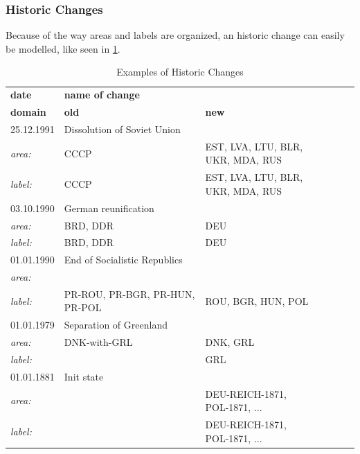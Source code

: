 

\subsubsection{Historic Changes} %
\label{ssub:historic_changes}
Because of the way areas and labels are organized, an historic change can easily be modelled, like seen in \ref{tab:changes}.

\begin{table}[ht]
\begin{small}
  \caption{Examples of Historic Changes}
  \label{tab:changes}
  \begin{center}
    \begin{tabular}{lllllll}
    \hline

    \hline
    \textbf{date} & \textbf{name of change} & \\
    \textbf{domain} & \textbf{old} & \textbf{new} \\
    \hline
    25.12.1991 & Dissolution of Soviet Union & \\
    \textit{area:} & CCCP & \pbox{5cm}{EST, LVA, LTU, BLR, \\ UKR, MDA, RUS} \\
    \textit{label:} & CCCP & \pbox{5cm}{EST, LVA, LTU, BLR, \\ UKR, MDA, RUS }\\
    \hline
    03.10.1990 & German reunification & \\
    \textit{area:} & BRD, DDR & DEU \\
    \textit{label:} & BRD, DDR & DEU \\
    \hline
    01.01.1990 & End of Socialistic Republics & \\
    \textit{area:} & & \\
    \textit{label:} & PR-ROU, PR-BGR, PR-HUN, PR-POL & ROU, BGR, HUN, POL \\
    \hline
    01.01.1979 & Separation of Greenland & \\
    \textit{area:} & DNK-with-GRL & DNK, GRL \\
    \textit{label:} & & GRL \\
    \hline
    01.01.1881 & Init state & \\
    \textit{area:} & & DEU-REICH-1871, POL-1871, ... \\
    \textit{label:} & & DEU-REICH-1871, POL-1871, ... \\
    \hline

    \hline
    \end{tabular}
  \end{center}
\end{small}
\end{table}

